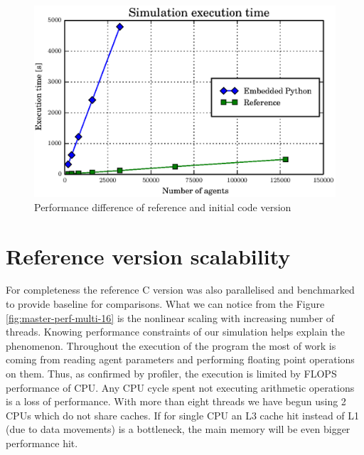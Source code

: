 \documentclass[12pt, a4paper]{report}
\begin{document}
\begin{figure}[H]
  \begin{center}
    \includegraphics[width=\columnwidth]{graphs/initial-target-perf.eps}
    \caption{Performance difference of reference and initial code version}
    \label{fig:target-initial-comp-perf}
  \end{center}
\end{figure}

\section{Reference version scalability}\label{sec:ref-c-scala}

For completeness the reference C version was also parallelised and benchmarked
to provide baseline for comparisons. What we can notice from the Figure
\ref{fig:master-perf-multi-16} is the nonlinear scaling with increasing number
of threads. Knowing performance constraints of our simulation helps explain
the phenomenon. Throughout the execution of the program the most of work
is coming from reading agent parameters and performing floating point operations
on them. Thus, as confirmed by profiler, the execution is limited by FLOPS
performance of CPU. Any CPU cycle spent not executing arithmetic operations
is a loss of performance. With more than eight threads we have begun using
2 CPUs which do not share caches. If for single CPU an L3 cache hit instead
of L1 (due to data movements) is a bottleneck, the main memory will be even
bigger performance hit.
\end{document}
